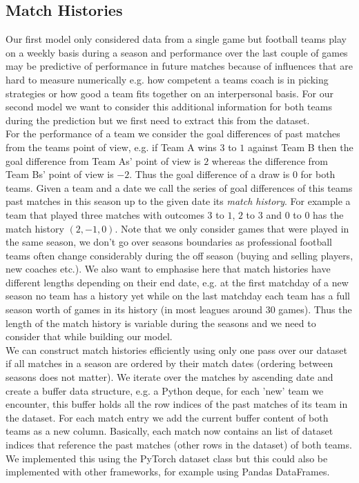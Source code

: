 \documentclass[a4paper]{article}
\begin{document}
\subsection{Match Histories}
Our first model only considered data from a single game but football teams play
on a weekly basis during a season and performance over the last couple of games
may be predictive of performance in future matches because of influences that
are hard to measure numerically e.g. how competent a teams coach is in picking
strategies or how good a team fits together on an interpersonal basis. For our
second model we want to consider this additional information for both teams
during the prediction but we first need to extract this from the dataset. \\
For the performance of a team we consider the goal differences of past matches
from the teams point of view, e.g. if Team A wins $3$ to $1$ against Team B then
the goal difference from Team As' point of view is $2$ whereas the difference
from Team Bs' point of view is $-2$. Thus the goal difference of a draw is $0$
for both teams. Given a team and a date we call the series of goal differences
of this teams past matches in this season up to the given date its \textit{match
history}. For example a team that played three matches with outcomes $3$ to $1$,
$2$ to $3$ and $0$ to $0$ has the match history $(2, -1, 0)$. Note that we only
consider games that were played in the same season, we don't go over seasons
boundaries as professional football teams often change considerably during the
off season (buying and selling players, new coaches etc.). We also want to
emphasise here that match histories have different lengths depending on their
end date, e.g. at the first matchday of a new season no team has a history yet
while on the last matchday each team has a full season worth of games in its
history (in most leagues around $30$ games). Thus the length of the match
history is variable during the seasons and we need to consider that while
building our model. \\
We can construct match histories efficiently using only one pass over our
dataset if all matches in a season are ordered by their match dates (ordering
between seasons does not matter). We iterate over the matches by ascending date
and create a buffer data structure, e.g. a Python deque,  for each 'new' team we
encounter, this buffer holds all the row indices of the past matches of its team
in the dataset. For each match entry we add the current buffer content of both
teams as a new column. Basically, each match now contains an list of dataset
indices that reference the past matches (other rows in the dataset) of both
teams. We implemented this using the PyTorch dataset class but this could also
be implemented with other frameworks, for example using Pandas DataFrames.
\end{document}
